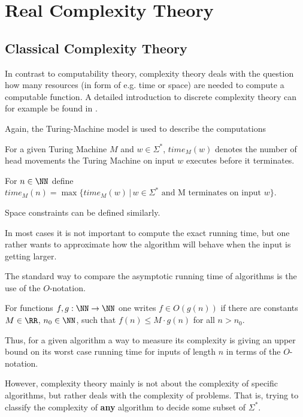 \section{Real Complexity Theory}\label{section:real_complexity}
	\subsection{Classical Complexity Theory}
    In contrast to computability theory, complexity theory deals with the
    question how many resources (in form of e.g. time or space) are needed to
    compute a computable function.
    A detailed introduction to discrete complexity theory can for example be
    found in \cite{complexity}.

    Again, the Turing-Machine model is used to describe the computations
		\begin{definition}
			For a given Turing Machine $M$ and $w \in \Sigma^*$, $time_M(w)$ denotes the number of head movements 
			the Turing Machine on input $w$ executes before it terminates. 

			For $n \in \NN$ define $time_M(n) = \max \{ time_M(w) \,|\, w \in
        \Sigma^* \text{ and M terminates on input }w \}$.

        Space constraints can be defined similarly.
		\end{definition}
    In most cases it is not important to compute the exact running time, but
    one rather wants to approximate how the algorithm will behave when the
    input is getting larger.
    
    The standard way to compare the asymptotic running time of algorithms is
    the use of the $O$-notation.
		\begin{definition}
			For functions $f, g: \NN \to \NN$ one writes $f \in O(g(n))$ if there are constants $M \in \RR$, $n_0 \in \NN$, such that
			$ f(n) \leq M \cdot g(n)$ for all $n > n_0$. 
		\end{definition}
			Thus, for a given algorithm a way to measure its complexity is giving an
      upper bound on its worst case running time for inputs of length $n$ in
      terms of the $O$-notation. 

			However, complexity theory mainly is not about the complexity of specific
      algorithms, but rather deals with the complexity of problems. 
      That is, trying to classify the complexity of \textbf{any} algorithm to
      decide some subset of $\Sigma^*$.
      
